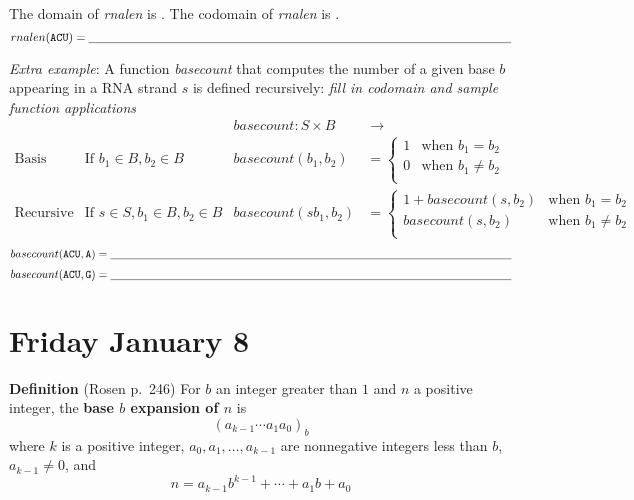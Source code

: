 \documentclass[12pt, oneside]{article}
\begin{document}
The domain of \textit{rnalen} is \underline{}.
The codomain of \textit{rnalen} is \underline{}.
\[
rnalen(\A\C\U) = \underline{\phantom{\hspace{5in}}}
\]

\vfill

{\it Extra example}: A function \textit{basecount} that computes the number of a given base $b$ appearing in a RNA strand $s$ is defined recursively:  {\it fill in codomain and sample function
applications}
\[
\begin{array}{llll}
& & \textit{basecount} : S \times B & \to \phantom{\mathbb{N}} \\
\textrm{Basis Step:} &  \textrm{If } b_1 \in B, b_2 \in B & \textit{basecount}(b_1, b_2) & =
        \begin{cases}
            1 & \textrm{when } b_1 = b_2 \\
            0 & \textrm{when } b_1 \neq b_2 \\
        \end{cases} \\
\textrm{Recursive Step:} & \textrm{If } s \in S, b_1 \in B, b_2 \in B &\textit{basecount}(s b_1, b_2) & =
        \begin{cases}
            1 + \textit{basecount}(s, b_2) & \textrm{when } b_1 = b_2 \\
            \textit{basecount}(s, b_2) & \textrm{when } b_1 \neq b_2 \\
        \end{cases}
\end{array}
\]
\[
basecount(\A\C\U,\A) = \underline{\phantom{\hspace{5in}}}
\]
\[
basecount(\A\C\U,\G) = \underline{\phantom{\hspace{5in}}}
\]

\section*{Friday January 8}


{\bf Definition} (Rosen p.\ 246) For $b$ an integer greater than $1$ and $n$ a positive integer, 
the {\bf base $b$ expansion of $n$}  is
\[
(a_{k-1} \cdots a_1 a_0)_b
\]
where $k$ is a positive integer, $a_0, a_1, \ldots, a_{k-1}$ are nonnegative integers less than $b$, $a_{k-1} \neq  0$, and
\[
n =  a_{k-1} b^{k-1} + \cdots + a_1b + a_0
\]
\end{document}
